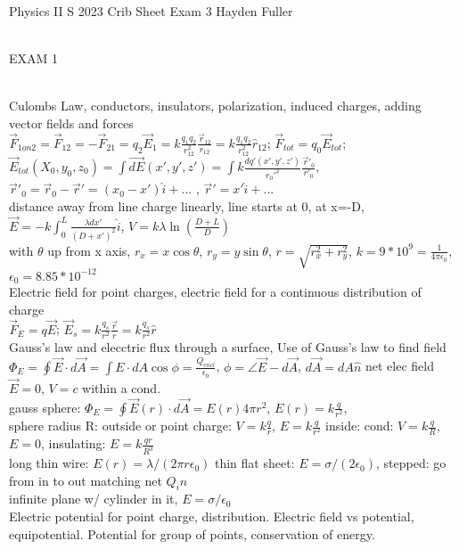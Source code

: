 \documentclass{article}
\begin{document}
Physics II S 2023 Crib Sheet Exam 3 Hayden Fuller
\begin{Large}\\EXAM 1\end{Large}
\\\indent Culombs Law, conductors, insulators, polarization, induced charges, adding vector fields and forces
\\$\vec F_{1on2}=\vec F_{12}=-\vec{F}_{21}=q_2\vec{E}_1=k\frac{q_1q_2}{r_{12}^2}\frac{\vec{r}_{12}}{r_{12}}=k\frac{q_1q_2}{r_{12}^2}\hat r_{12}$; $\vec{F}_{tot}=q_0\vec{E}_{tot}$; $\vec{E}_{tot}(X_0,y_0,z_0)=\int \vec{dE}(x',y',z')=\int k\frac{dq'(x',y',z')}{r_0'^2}\frac{\vec{r}'_0}{r'_0}$, $\vec{r}'_0=\vec{r}_0-\vec{r}'=(x_0-x')\hat i+$... , $\vec{r}'=x'\hat i +$...
\\distance away from line charge linearly, line starts at 0, at x=-D, $\vec{E}=-k\int_0^L\frac{\lambda dx'}{(D+x')^2}\hat i$, $V=k\lambda\ln(\frac{D+L}{D})$
\\with $\theta$ up from x axis, $r_x=x\cos\theta$, $r_y=y\sin\theta$, $r=\sqrt{r_x^2+r_y^2}$, $k=9*10^9=\frac{1}{4\pi \epsilon_0}$, $\epsilon_0=8.85*10^{-12}$
\\\indent Electric field for point charges, electric field for a continuous distribution of charge
\\$\vec{F}_E=q\vec{E}$; $\vec{E}_s=k\frac{q_s}{r^2}\frac{\vec{r}}{r}=k\frac{q_s}{r^2}\hat r$
\\\indent Gauss's law and elecctric flux through a surface, Use of Gauss's law to find field
\\$\Phi_E=\oint\vec{E}\cdot d\vec{A}=\int E \cdot dA \cos \phi=\frac{Q_{encl}}{\epsilon_0}$, $\phi=\angle \vec E-d\vec A$, $d\vec A= dA\hat n$ net elec field $\vec{E}=0$, $V=c$ within a cond.
\\gauss sphere: $\Phi_E=\oint\vec E (r)\cdot d\vec A=E(r)4\pi r^2$, $E(r)=k\frac{q}{r^2}$,
\\sphere radius R: outside or point charge: $V=k\frac{q}{r}$, $E=k \frac{q}{r^2}$ inside: cond: $V=k\frac{q}{R}$, $E=0$, insulating: $E=k\frac{qr}{R^3}$
\\long thin wire: $E(r)=\lambda/(2\pi r\epsilon_0)$ \quad thin flat sheet: $E=\sigma/(2\epsilon_0)$, stepped: go from in to out matching net $Q_in$
\\infinite plane w/ cylinder in it, $E=\sigma/\epsilon_0$
\\\indent Electric potential for point charge, distribution. Electric field vs potential, equipotential. Potential for group of points, conservation of energy.
\end{document}
